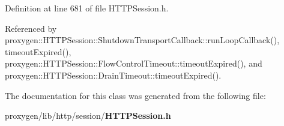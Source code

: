 Definition at line 681 of file H\+T\+T\+P\+Session.\+h.



Referenced by proxygen\+::\+H\+T\+T\+P\+Session\+::\+Shutdown\+Transport\+Callback\+::run\+Loop\+Callback(), timeout\+Expired(), proxygen\+::\+H\+T\+T\+P\+Session\+::\+Flow\+Control\+Timeout\+::timeout\+Expired(), and proxygen\+::\+H\+T\+T\+P\+Session\+::\+Drain\+Timeout\+::timeout\+Expired().



The documentation for this class was generated from the following file\+:\begin{DoxyCompactItemize}
\item 
proxygen/lib/http/session/{\bf H\+T\+T\+P\+Session.\+h}\end{DoxyCompactItemize}
